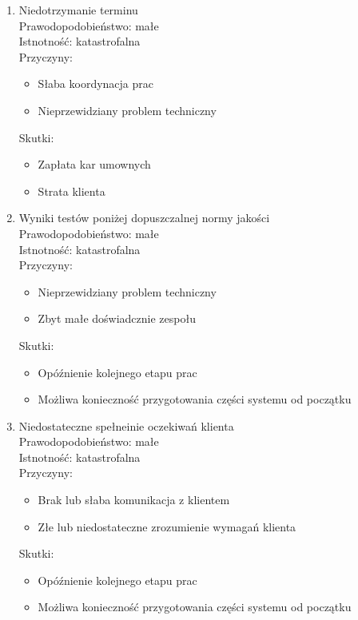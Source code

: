\documentclass[12pt,a4paper]{article}
\begin{document}
\begin{enumerate}
    \item Niedotrzymanie terminu\\
    Prawodopodobieństwo: małe\\
    Istnotność: katastrofalna\\
    Przyczyny:
    \begin{itemize}
        \item Słaba koordynacja prac
        \item Nieprzewidziany problem techniczny
    \end{itemize}
    Skutki:
    \begin{itemize}
        \item Zapłata kar umownych
        \item Strata klienta
    \end{itemize}

    \item Wyniki testów poniżej dopuszczalnej normy jakości\\
    Prawodopodobieństwo: małe\\
    Istnotność: katastrofalna\\
    Przyczyny:
    \begin{itemize}
        \item Nieprzewidziany problem techniczny
        \item Zbyt małe doświadcznie zespołu
    \end{itemize}
    Skutki:
    \begin{itemize}
        \item Opóźnienie kolejnego etapu prac
        \item Możliwa konieczność przygotowania części systemu od początku
    \end{itemize}

    \item Niedostateczne spełneinie oczekiwań klienta\\
    Prawodopodobieństwo: małe\\
    Istnotność: katastrofalna\\
    Przyczyny:
    \begin{itemize}
        \item Brak lub słaba komunikacja z klientem
        \item Złe lub niedostateczne zrozumienie wymagań klienta
    \end{itemize}
    Skutki:
    \begin{itemize}
        \item Opóźnienie kolejnego etapu prac
        \item Możliwa konieczność przygotowania części systemu od początku
    \end{itemize}


\end{enumerate}
\end{document}
